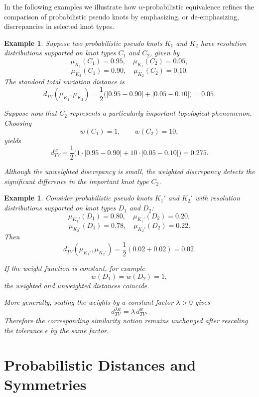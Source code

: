 \documentclass[a4paper, reqno, 12pt]{amsart}
\theoremstyle{plain}
\newtheorem{ex}[theorem]{Example}
\theoremstyle{definition}
\begin{document}
In the following examples we illustrate how \(w\)-probabilistic equivalence refines the comparison of probabilistic pseudo knots by emphasizing, or de-emphasizing, discrepancies in selected knot types.

\begin{ex}\rm
Suppose two probabilistic pseudo knots \(K_1\) and \(K_2\) have resolution distributions supported on knot types \(C_1\) and \(C_2\), given by
\[
\mu_{K_1}(C_1)=0.95,\quad \mu_{K_1}(C_2)=0.05,
\]
\[
\mu_{K_2}(C_1)=0.90,\quad \mu_{K_2}(C_2)=0.10.
\]
The standard total variation distance is
\[
d_{TV}(\mu_{K_1},\mu_{K_2})
=
\frac12\big(|0.95-0.90|+|0.05-0.10|\big)
=
0.05.
\]

Suppose now that \(C_2\) represents a particularly important topological phenomenon. Choosing
\[
w(C_1)=1,
\qquad
w(C_2)=10,
\]
yields
\[
d_{TV}^{w}
= \frac12\big(1\cdot|0.95-0.90|
+
10\cdot|0.05-0.10|\big)
= 0.275.
\]

Although the unweighted discrepancy is small, the weighted discrepancy detects the significant difference in the important knot type \(C_2\).
\end{ex}

\begin{ex}\rm
Consider probabilistic pseudo knots \(K_1'\) and \(K_2'\) with resolution distributions supported on knot types \(D_1\) and \(D_2\):
\[
\mu_{K_1'}(D_1)=0.80,\quad \mu_{K_1'}(D_2)=0.20,
\]
\[
\mu_{K_2'}(D_1)=0.78,\quad \mu_{K_2'}(D_2)=0.22.
\]
Then
\[
d_{TV}(\mu_{K_1'},\mu_{K_2'})
=
\frac12(0.02+0.02)
=
0.02 .
\]

If the weight function is constant, for example
\[
w(D_1)=w(D_2)=1,
\]
the weighted and unweighted distances coincide.

More generally, scaling the weights by a constant factor \(\lambda>0\) gives
\[
d_{TV}^{\lambda w} = \lambda\, d_{TV}^{w}.
\]
Therefore the corresponding similarity notion remains unchanged after rescaling the tolerance \(\epsilon\) by the same factor.
\end{ex}





\section{Probabilistic Distances and Symmetries}\label{distsym}
\end{document}
